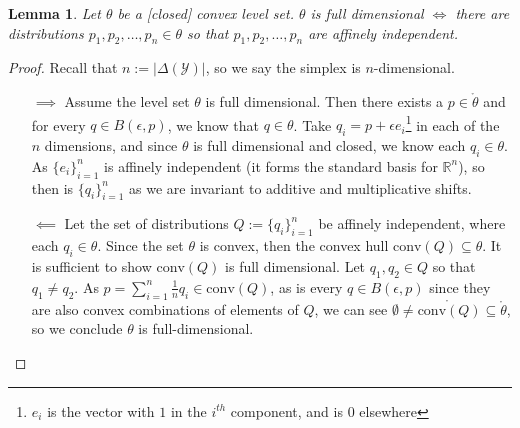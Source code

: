 \documentclass[12pt]{article}
\newcommand{\reals}{\mathbb{R}}
\newcommand{\Y}{\mathcal{Y}}
\newcommand{\inter}[1]{\mathring{#1}}%
\newcommand{\conv}{\mathrm{conv}}
\newtheorem{lemma}{Lemma}
\begin{document}
\begin{lemma}\label{lem:nonempty-inter-iff-aff-ind}
	Let $\theta$ be a [closed] convex level set.
	$\theta$ is full dimensional $\iff$ there are distributions $p_1, p_2, \ldots, p_n \in \theta$ so that $p_1, p_2, \ldots, p_n$ are affinely independent.
\end{lemma}
\begin{proof}
	Recall that $n := |\Delta(\Y)|$, so we say the simplex is $n$-dimensional.
	\begin{enumerate}
		\item [$\implies$]
		Assume the level set $\theta$ is full dimensional.
		Then there exists a $p \in \inter{\theta}$ and for every $q \in B(\epsilon, p)$, we know that $q \in \theta$.
		Take $q_i = p + \epsilon e_i$\footnote{$e_i$ is the vector with $1$ in the $i^{th}$ component, and is $0$ elsewhere} in each of the $n$ dimensions, and since $\theta$ is full dimensional and closed, we know each $q_i \in\theta$.
		As $\{e_i\}_{i=1}^n$ is affinely independent (it forms the standard basis for $\reals^n$), so then is $\{q_i\}_{i=1}^n$ as we are invariant to additive and multiplicative shifts.		
		
		\item [$\impliedby$]
		Let the set of distributions $Q := \{q_i\}_{i=1}^n$ be affinely independent, where each $q_i \in \theta$.
		Since the set $\theta$ is convex, then the convex hull $\conv(Q) \subseteq \theta$.
		It is sufficient to show $\conv(Q)$ is full dimensional.
		Let $q_1, q_2 \in Q$ so that $q_1 \neq q_2$.
		As $p = \sum_{i=1}^n \frac{1}{n}q_i \in \conv(Q)$, as is every $q \in B(\epsilon, p)$ since they are also convex combinations of elements of $Q$, we can see $\emptyset \neq \inter{\conv(Q)} \subseteq \inter{\theta}$, so we conclude $\theta$ is full-dimensional.
	\end{enumerate}
\end{proof}
\end{document}
